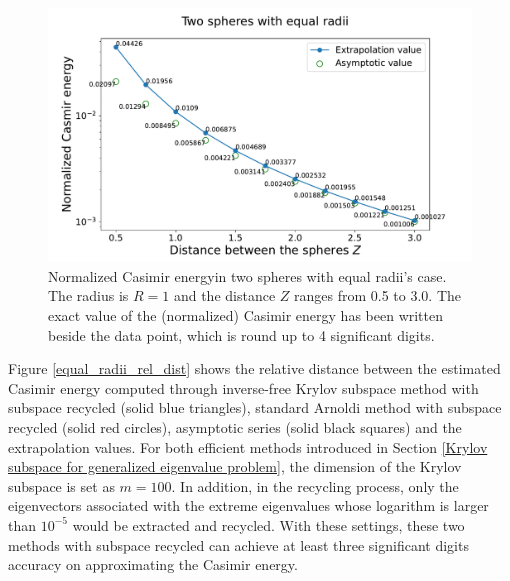 \begin{figure}[H]
    \centering
    \includegraphics[scale = 0.5]{figures/Spheres_equal_CasE.pdf}
    \caption[Caption for LOF]{Normalized Casimir energy\protect\footnotemark in two spheres with equal radii's case. The radius is $R = 1$ and the distance $Z$ 
    ranges from 0.5 to 3.0. The exact value of the (normalized) Casimir energy has been written beside the data point, which is round up to 4 significant digits.}
    \label{Casimir energy between spheres with equal radii}
\end{figure}

Figure \ref{equal_radii_rel_dist} shows the relative distance between the estimated Casimir energy computed through inverse-free Krylov subspace method with subspace 
recycled (solid blue triangles), standard Arnoldi method with subspace recycled (solid red circles), asymptotic series (solid black squares) and the extrapolation values.
For both efficient methods introduced in Section \ref{Krylov subspace for generalized eigenvalue problem}, the dimension of the Krylov subspace is set as $m = 100$. 
In addition, in the recycling process, only the eigenvectors associated with the extreme eigenvalues whose logarithm is larger than $10^{-5}$
would be extracted and recycled. With these settings, these two methods with subspace recycled can achieve at least three significant digits accuracy on 
approximating the Casimir energy.

